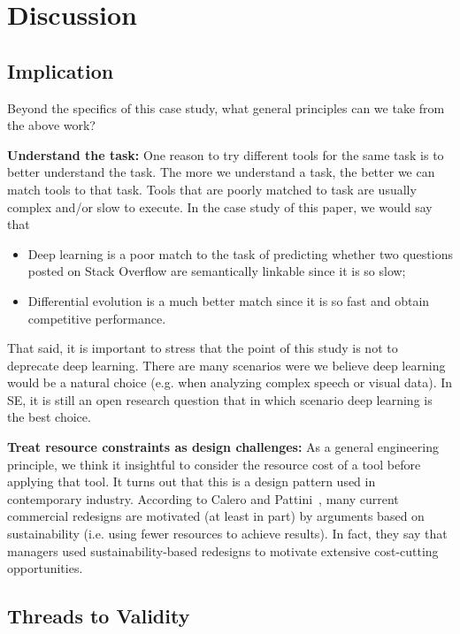\documentclass[sigconf,review, anonymous]{acmart}
\theoremstyle{break}
\newcommand{\bi}{\begin{itemize}[leftmargin=0.4cm]}
\newcommand{\ei}{\end{itemize}}
\begin{document}
\section{Discussion}\label{discussion}
 
\subsection{Implication}

Beyond the specifics of this case study, what general principles
can we take from the above work?

\textbf{Understand the task:}
One reason to try different tools for the same task is to better
understand the task.
The more we understand a task, the better we can match tools to that task. Tools that are poorly matched to task are usually complex and/or slow to execute.  In the case study of this paper, we would say that

\bi
\item
Deep learning is a poor match to the task of predicting whether two questions posted on Stack Overflow are semantically linkable
since it is so slow;
\item
Differential evolution is a much better match since it is so fast and obtain competitive performance.
\ei
That said, 
it  is important to stress that the point of this study
is not to deprecate deep learning.  
There are many scenarios were we
 believe  deep learning would be a natural
 choice (e.g. when analyzing complex speech or visual data). 
 In SE, it is still an open research question that in which scenario deep learning
 is the best choice.





\textbf{Treat resource constraints as design challenges:}
As a general engineering principle,
we think it insightful to consider the resource cost
of a tool before applying that tool.
It turns out that this is a design pattern used in contemporary industry.
According to Calero and Pattini~\cite{calero2015green},  many current commercial  redesigns are motivated (at least in part) by arguments based on sustainability (i.e. using fewer resources to achieve results).
In fact, they say that managers used sustainability-based redesigns to 
motivate extensive cost-cutting opportunities. 

 


 
\subsection{Threads to Validity}
\end{document}

